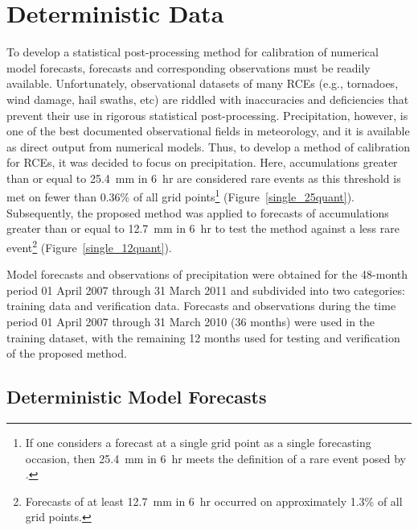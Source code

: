 

\section{Deterministic Data}
\label{ddata}

To develop a statistical post-processing method for calibration of numerical model forecasts, forecasts and corresponding observations must be readily available.
Unfortunately, observational datasets of many RCEs (e.g., tornadoes, wind damage, hail swaths, etc) are riddled with inaccuracies and deficiencies \citep{Doswell1988, Weiss2002, Trapp2006, Ortega2009} that prevent their use in rigorous statistical post-processing.
Precipitation, however, is one of the best documented observational fields in meteorology, and it is available as direct output from numerical models.
Thus, to develop a method of calibration for RCEs, it was decided to focus on precipitation.
Here, accumulations greater than or equal to \mbox{25.4 mm} in \mbox{6 hr} are considered rare events as this threshold is met on fewer than 0.36\% of all grid points\footnote{If one considers a forecast at a single grid point as a single forecasting occasion, then \mbox{25.4 mm} in \mbox{6 hr} meets the definition of a rare event posed by \cite{Murphy1991}.} (\mbox{Figure \ref{single_25quant}}).
Subsequently, the proposed method was applied to forecasts of accumulations greater than or equal to \mbox{12.7 mm} in \mbox{6 hr} to test the method against a less rare event\footnote{Forecasts of at least \mbox{12.7 mm} in \mbox{6 hr} occurred on approximately 1.3\% of all grid points.} (\mbox{Figure \ref{single_12quant}}).

Model forecasts and observations of precipitation were obtained for the 48-month period 01 April 2007 through 31 March 2011 and subdivided into two categories: training data and verification data.
Forecasts and observations during the time period 01 April 2007 through 31 March 2010 (36 months) were used in the training dataset, with the remaining 12 months used for testing and verification of the proposed method.




\subsection{Deterministic Model Forecasts}
\label{dmodel}

